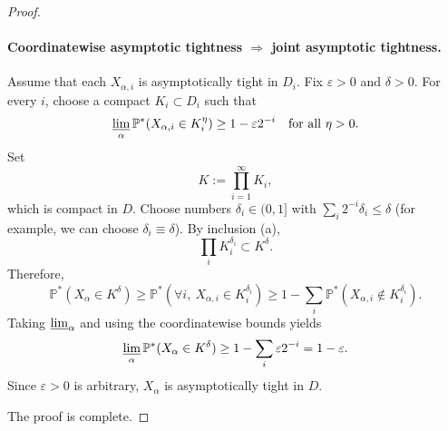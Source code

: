 \documentclass[12pt]{article}
\renewcommand{\(}{\left(}%
\renewcommand{\)}{\right)}%
\renewcommand{\[}{\left[}%
\renewcommand{\]}{\right]}%
\newtheorem{proof}{Proof.}}
\begin{document}
\begin{proof}
\paragraph{Coordinatewise asymptotic tightness $\Longrightarrow$ joint asymptotic tightness.}

Assume that each $X_{\alpha,i}$ is asymptotically tight in $D_i$. Fix $\varepsilon>0$
and $\delta>0$. For every $i$, choose a compact $K_i\subset D_i$ such that
\begin{equation*}
\varliminf_\alpha \mathbb P^*(X_{\alpha,i}\in K_i^\eta)
\ge 1-\varepsilon 2^{-i}
\quad\text{for all }\eta>0.
\end{equation*}
Set
\begin{equation*}
K:=\prod_{i=1}^\infty K_i,
\end{equation*}
which is compact in $D$.
Choose numbers $\delta_i\in(0,1]$ with $\sum_i 2^{-i}\delta_i\le\delta$ (for example, we can choose $\delta_i\equiv \delta$).
By inclusion (a),
\begin{equation*}
\prod_i K_i^{\delta_i} \subset K^\delta.
\end{equation*}
Therefore,
\begin{equation*}
\mathbb P^*(X_\alpha\in K^\delta)
\ge
\mathbb P^*(\forall i,\ X_{\alpha,i}\in K_i^{\delta_i})
\ge
1-\sum_i \mathbb P^*(X_{\alpha,i}\notin K_i^{\delta_i}).
\end{equation*}
Taking $\varliminf_\alpha$ and using the coordinatewise bounds yields
\begin{equation*}
\varliminf_\alpha \mathbb P^*(X_\alpha\in K^\delta)
\ge 1-\sum_i \varepsilon 2^{-i}
=1-\varepsilon.
\end{equation*}
Since $\varepsilon>0$ is arbitrary, $X_\alpha$ is asymptotically tight in $D$.

\medskip
\noindent
The proof is complete.
\end{proof}
\end{document}
